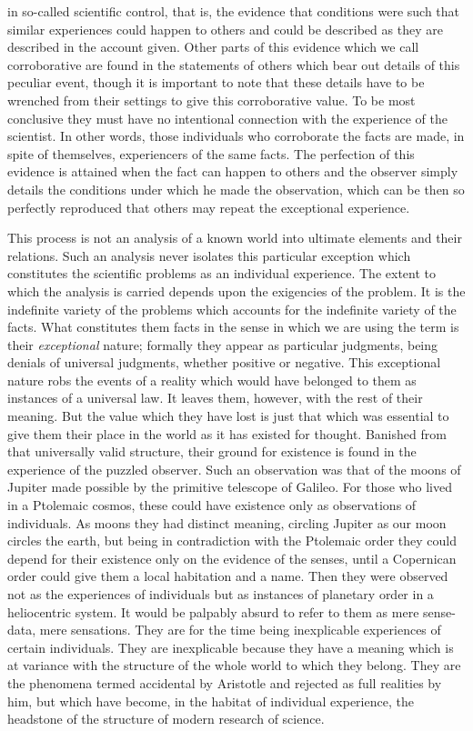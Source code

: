 \documentclass[12pt]{article}
\begin{document}
in so-called scientific control, that is, the evidence that
conditions were such that similar experiences could
happen to others and could be described as they are
described in the account given. Other parts of this
evidence which we call corroborative are found in the
statements of others which bear out details of this
peculiar event, though it is important to note that
these details have to be wrenched from their settings
to give this corroborative value. To be most conclusive
they must have no intentional connection with
the experience of the scientist. In other words,
those individuals who corroborate the facts are made,
in spite of themselves, experiencers of the same facts.
The perfection of this evidence is attained when the
fact can happen to others and the observer simply
details the conditions under which he made the observation,
which can be then so perfectly reproduced that
others may repeat the exceptional experience.


This process is not an analysis of a known world
into ultimate elements and their relations. Such an
analysis never isolates this particular exception which
constitutes the scientific problems as an individual experience.
The extent to which the analysis is carried
depends upon the exigencies of the problem. It is the
indefinite variety of the problems which accounts for
the indefinite variety of the facts. What constitutes
them facts in the sense in which we are using the
term is their \emph{exceptional} nature; formally they appear
as particular judgments, being denials of universal
judgments, whether positive or negative. This exceptional
nature robs the events of a reality which would
have belonged to them as instances of a universal law.
It leaves them, however, with the rest of their meaning.
But the value which they have lost is just that which
was essential to give them their place in the world as
it has existed for thought. Banished from that universally
valid structure, their ground for existence is
found in the experience of the puzzled observer. Such
an observation was that of the moons of Jupiter made
possible by the primitive telescope of Galileo. For
those who lived in a Ptolemaic cosmos, these could have
existence only as observations of individuals. As moons
they had distinct meaning, circling Jupiter as our
moon circles the earth, but being in contradiction with
the Ptolemaic order they could depend for their existence
only on the evidence of the senses, until a Copernican
order could give them a local habitation and a
name. Then they were observed not as the experiences
of individuals but as instances of planetary order in
a heliocentric system. It would be palpably absurd to
refer to them as mere sense-data, mere sensations. They
are for the time being inexplicable experiences of certain
individuals. They are inexplicable because they
have a meaning which is at variance with the structure
of the whole world to which they belong. They are the
phenomena termed accidental by Aristotle and rejected
as full realities by him, but which have become, in the
habitat of individual experience, the headstone of the
structure of modern research of science.
\end{document}
